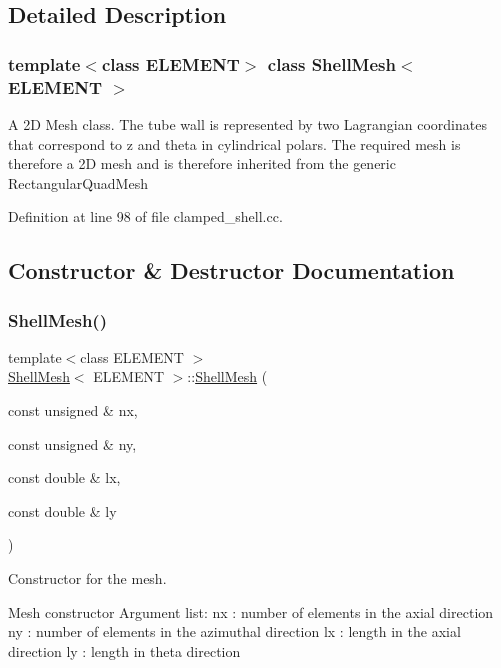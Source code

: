 \subsection{Detailed Description}
\subsubsection*{template$<$class E\+L\+E\+M\+E\+NT$>$\newline
class Shell\+Mesh$<$ E\+L\+E\+M\+E\+N\+T $>$}

A 2D Mesh class. The tube wall is represented by two Lagrangian coordinates that correspond to z and theta in cylindrical polars. The required mesh is therefore a 2D mesh and is therefore inherited from the generic Rectangular\+Quad\+Mesh 

Definition at line 98 of file clamped\+\_\+shell.\+cc.



\subsection{Constructor \& Destructor Documentation}
\mbox{\label{classShellMesh_a6ce8404f69fa3f4c10dac5c18cff0699}} 
\subsubsection{\texorpdfstring{Shell\+Mesh()}{ShellMesh()}\hspace{0.1cm}{\footnotesize\ttfamily [1/2]}}
{\footnotesize\ttfamily template$<$class E\+L\+E\+M\+E\+NT $>$ \\
\hyperlink{classShellMesh}{Shell\+Mesh}$<$ E\+L\+E\+M\+E\+NT $>$\+::\hyperlink{classShellMesh}{Shell\+Mesh} (\begin{DoxyParamCaption}\item[{const unsigned \&}]{nx,  }\item[{const unsigned \&}]{ny,  }\item[{const double \&}]{lx,  }\item[{const double \&}]{ly }\end{DoxyParamCaption})}



Constructor for the mesh. 

Mesh constructor Argument list\+: nx \+: number of elements in the axial direction ny \+: number of elements in the azimuthal direction lx \+: length in the axial direction ly \+: length in theta direction 

